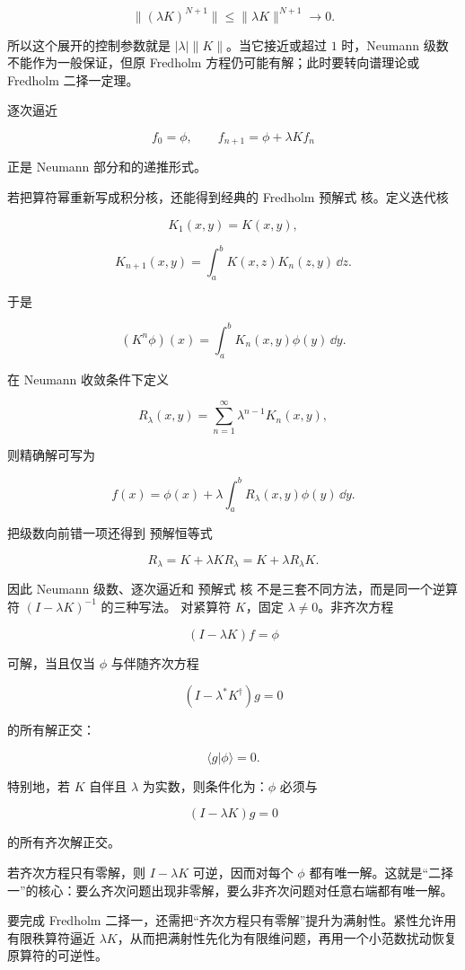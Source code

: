 \[
\|(\lambda K)^{N+1}\|
\le\|\lambda K\|^{N+1}\to0.
\]

所以这个展开的控制参数就是 $|\lambda|\|K\|$。当它接近或超过 $1$ 时，Neumann 级数不能作为一般保证，但原 Fredholm 方程仍可能有解；此时要转向谱理论或 Fredholm 二择一定理。

逐次逼近

\[
f_0=\phi,\qquad f_{n+1}=\phi+\lambda Kf_n
\]

正是 Neumann 部分和的递推形式。

若把算符幂重新写成积分核，还能得到经典的 Fredholm 预解式 核。定义迭代核

\[
K_1(x,y)=K(x,y),
\]

\[
K_{n+1}(x,y)
=\int_a^bK(x,z)K_n(z,y)\,\dd z.
\]

于是

\[
(K^n\phi)(x)=\int_a^bK_n(x,y)\phi(y)\,\dd y.
\]

在 Neumann 收敛条件下定义

\[
R_\lambda(x,y)
=\sum_{n=1}^{\infty}\lambda^{n-1}K_n(x,y),
\]

则精确解可写为

\[
{
f(x)=\phi(x)+\lambda\int_a^bR_\lambda(x,y)\phi(y)\,\dd y
}.
\]

把级数向前错一项还得到 预解恒等式

\[
R_\lambda=K+\lambda KR_\lambda
=K+\lambda R_\lambda K.
\]

因此 Neumann 级数、逐次逼近和 预解式 核 不是三套不同方法，而是同一个逆算符 $(I-\lambda K)^{-1}$ 的三种写法。
对紧算符 $K$，固定 $\lambda\neq0$。非齐次方程

\[
(I-\lambda K)f=\phi
\]

可解，当且仅当 $\phi$ 与伴随齐次方程

\[
(I-\lambda^*K^\dagger)g=0
\]

的所有解正交：

\begin{equation*}{\langle g|\phi\rangle=0}.\end{equation*}

特别地，若 $K$ 自伴且 $\lambda$ 为实数，则条件化为：$\phi$ 必须与

\[
(I-\lambda K)g=0
\]

的所有齐次解正交。

若齐次方程只有零解，则 $I-\lambda K$ 可逆，因而对每个 $\phi$ 都有唯一解。这就是``二择一''的核心：要么齐次问题出现非零解，要么非齐次问题对任意右端都有唯一解。

要完成 Fredholm 二择一，还需把“齐次方程只有零解”提升为满射性。紧性允许用有限秩算符逼近 $\lambda K$，从而把满射性先化为有限维问题，再用一个小范数扰动恢复原算符的可逆性。

